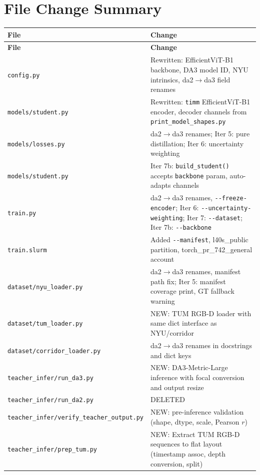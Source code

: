 \documentclass[11pt,a4paper]{article}
\begin{document}
\section{File Change Summary}
\label{sec:files}

\begin{longtable}{lp{8cm}}
\toprule
\textbf{File} & \textbf{Change} \\
\midrule
\endfirsthead
\toprule
\textbf{File} & \textbf{Change} \\
\midrule
\endhead
\texttt{config.py}             & Rewritten: EfficientViT-B1 backbone, DA3 model ID, NYU intrinsics, da2$\to$da3 field renames \\
\texttt{models/student.py}     & Rewritten: \texttt{timm} EfficientViT-B1 encoder, decoder channels from \texttt{print\_model\_shapes.py} \\
\texttt{models/losses.py}      & da2$\to$da3 renames; Iter 5: pure distillation; Iter 6: uncertainty weighting \\
\texttt{models/student.py}     & Iter 7b: \texttt{build\_student()} accepts \texttt{backbone} param, auto-adapts channels \\
\texttt{train.py}              & da2$\to$da3 renames, \texttt{-{}-freeze-encoder}; Iter 6: \texttt{-{}-uncertainty-weighting}; Iter 7: \texttt{-{}-dataset}; Iter 7b: \texttt{-{}-backbone} \\
\texttt{train.slurm}           & Added \texttt{-{}-manifest}, l40s\_public partition, torch\_pr\_742\_general account \\
\texttt{dataset/nyu\_loader.py}  & da2$\to$da3 renames, manifest path fix; Iter 5: manifest coverage print, GT fallback warning \\
\texttt{dataset/tum\_loader.py}      & NEW: TUM RGB-D loader with same dict interface as NYU/corridor \\
\texttt{dataset/corridor\_loader.py} & da2$\to$da3 renames in docstrings and dict keys \\
\texttt{teacher\_infer/run\_da3.py}  & NEW: DA3-Metric-Large inference with focal conversion and output resize \\
\texttt{teacher\_infer/run\_da2.py}  & DELETED \\
\texttt{teacher\_infer/verify\_teacher\_output.py} & NEW: pre-inference validation (shape, dtype, scale, Pearson $r$) \\
\texttt{teacher\_infer/prep\_tum.py}  & NEW: Extract TUM RGB-D sequences to flat layout (timestamp assoc, depth conversion, split) \\

\end{longtable}
\end{document}
